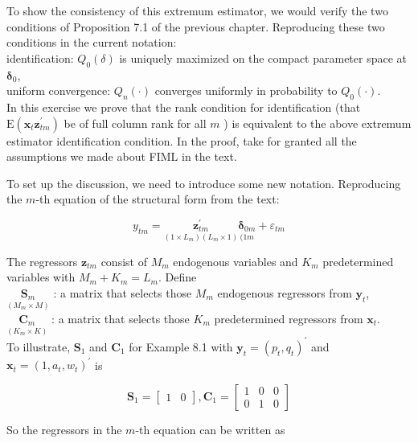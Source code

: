 \documentclass[10pt]{article}
\begin{document}
To show the consistency of this extremum estimator, we would verify the two conditions of Proposition 7.1 of the previous chapter. Reproducing these two conditions in the current notation:\\
identification: $Q_{0}(\delta)$ is uniquely maximized on the compact parameter space at $\boldsymbol{\delta}_{0}$,\\
uniform convergence: $Q_{n}(\cdot)$ converges uniformly in probability to $Q_{0}(\cdot)$.\\
In this exercise we prove that the rank condition for identification (that $\mathrm{E}\left(\mathbf{x}_{t} \mathbf{z}_{t m}^{\prime}\right)$ be of full column rank for all $m$ ) is equivalent to the above extremum estimator identification condition. In the proof, take for granted all the assumptions we made about FIML in the text.

To set up the discussion, we need to introduce some new notation. Reproducing the $m$-th equation of the structural form from the text:


\begin{equation*}
y_{t m}=\underset{\left(1 \times L_{m}\right)\left(L_{m} \times 1\right)}{\mathbf{z}_{t m}^{\prime}} \underset{(1 m}{\boldsymbol{\delta}_{0 m}}+\varepsilon_{t m} \tag{5}
\end{equation*}


The regressors $\mathbf{z}_{t m}$ consist of $M_{m}$ endogenous variables and $K_{m}$ predetermined variables with $M_{m}+K_{m}=L_{m}$. Define\\
$\underset{\left(M_{m} \times M\right)}{\mathbf{S}_{m}}$ : a matrix that selects those $M_{m}$ endogenous regressors from $\mathbf{y}_{t}$,\\
$\underset{\left(K_{m} \times K\right)}{\mathbf{C}_{m}}$ : a matrix that selects those $K_{m}$ predetermined regressors from $\mathbf{x}_{t}$.\\
To illustrate, $\mathbf{S}_{1}$ and $\mathbf{C}_{1}$ for Example 8.1 with $\mathbf{y}_{t}=\left(p_{t}, q_{t}\right)^{\prime}$ and $\mathbf{x}_{t}=\left(1, a_{t}, w_{t}\right)^{\prime}$ is

$$
\mathbf{S}_{1}=\left[\begin{array}{ll}
1 & 0
\end{array}\right], \mathbf{C}_{1}=\left[\begin{array}{lll}
1 & 0 & 0 \\
0 & 1 & 0
\end{array}\right]
$$

So the regressors in the $m$-th equation can be written as
\end{document}
